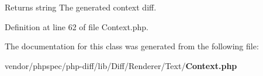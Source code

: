 \begin{DoxyReturn}{Returns}
string The generated context diff. 
\end{DoxyReturn}


Definition at line 62 of file Context.\+php.



The documentation for this class was generated from the following file\+:\begin{DoxyCompactItemize}
\item 
vendor/phpspec/php-\/diff/lib/\+Diff/\+Renderer/\+Text/{\bf Context.\+php}\end{DoxyCompactItemize}
